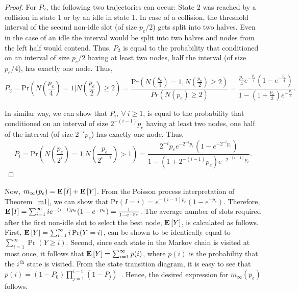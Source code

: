 \documentclass[12pt,draftcls,peerreview, onecolumn]{IEEEtran}
\newcommand{\brac}[1]{\left({#1}\right)}
\newcommand{\kth}{^{{\mathrm{th}}}}
\newcommand{\expect}[1]{{\bf E}\left[{#1}\right]}
\newcommand{\prob}[1]{\text{Pr}\brac{#1}}
\newcommand{\aveslots}[1]{m_{#1}}
\newcommand{\PI}[1]{P_{#1}}
\begin{document}
\begin{proof}
  For $\PI{2}$, the following two trajectories can occur: State 2 was
  reached by a collision in state 1 or by an idle in state 1. In case
  of a collision, the threshold interval of the second non-idle slot
  (of size $p_e/2$) gets split into two halves. Even in the case of an
  idle the interval would be split into two halves and nodes from the
  left half would contend.  Thus, $\PI{2}$ is equal to the probability
  that conditioned on an interval of size $p_e/2$ having at least two
  nodes, half the interval (of size $p_e/4$), has exactly one node. Thus,
\begin{equation*}
  \PI{2}= \prob{N\left(\frac{p_e}{4}\right)=1 \Big| N\left(\frac{p_e}{2}\right) \geq 2}
             = \frac{\prob{N\left(\frac{p_e}{4}\right)=1 , N\left(\frac{p_e}{2}\right) \geq 2}}{Pr(N(p_e) \geq 2)} = \frac{\frac{p_e}{4}
  e^{-\frac{p_e}{4} }(1-e^{-\frac{p_e}{4} })}{1-(1+\frac{p_e}{2}
  )e^{-\frac{p_e}{2} }}.
\end{equation*}

In similar way, we can show that $\PI{i},~\forall~i\ge 1$, is equal to
the probability that conditioned on an interval of size
$2^{-(i-1)}p_e$ having at least two nodes, one half of the interval (of size
$2^{-i}p_e$) has exactly one node. Thus,
    \begin{equation}
  \PI{i}= \prob{N\left(\frac{p_e}{2^{i}}\right)=1 \Big| N\left(\frac{p_e}{2^{i-1}}\right) > 1}
             = \frac{2^{-i}p_ee^{-2^{-i}p_e}(1-e^{-2^{-i}p_e})}{1-(1+2^{-(i-1)}p_e)e^{-2^{-(i-1)}p_e}}.
  \end{equation}
\end{proof}

Now, $\aveslots{\infty}(p_e)=\expect{I}+\expect{Y}$. From the Poisson
process interpretation of Theorem~\ref{m1}, we can show that
$\prob{I=i} = e^{-(i-1)p_e}(1-e^{-p_e})$. Therefore, $\expect{I} =
\sum_{i=1}^\infty ie^{-(i-1)p_e}(1-e^{-p_e}) = \frac{1}{1-e^{-p_e}}$.
The average number of slots required after the first non-idle slot to
select the best node, $\expect{Y}$, is calculated as follows.  First,
\mbox{$\expect{Y} = \sum_{i=1}^\infty i \Pr(Y=i)$}, can be shown to be
identically equal to $\sum_{i=1}^\infty \Pr(Y \geq i)$.  Second, since
each state in the Markov chain is visited at most once, it follows
that $\expect{Y} = \sum_{i=1}^\infty p(i)$, where $p(i)$ is the
probability that the $i\kth$ state is visited.  From the state
transition diagram, it is easy to see that \mbox{$p(i)=
  (1-\PI{0})\prod_{j=1}^{i-1} (1-\PI{j})$ }. Hence, the desired
expression for $\aveslots{\infty}(p_e)$ follows.
\end{document}
